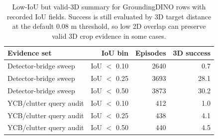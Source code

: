 \begin{table}[t]
\centering
\caption{Low-IoU but valid-3D summary for GroundingDINO rows with recorded IoU fields. Success is still evaluated by 3D target distance at the default 0.08 m threshold, so low 2D overlap can preserve valid 3D crop evidence in some cases.}
\label{tab:low-iou-valid-3d}
\footnotesize
\begin{tabular}{lrrr}
\toprule
Evidence set & IoU bin & Episodes & 3D success \\
\midrule
Detector-bridge sweep & IoU $<$ 0.10 & 2640 & 0.7 \\
Detector-bridge sweep & IoU $<$ 0.25 & 3693 & 28.1 \\
Detector-bridge sweep & IoU $<$ 0.50 & 3873 & 30.2 \\
YCB/clutter query audit & IoU $<$ 0.10 & 412 & 1.0 \\
YCB/clutter query audit & IoU $<$ 0.25 & 438 & 4.1 \\
YCB/clutter query audit & IoU $<$ 0.50 & 440 & 4.5 \\
\bottomrule
\end{tabular}
\end{table}
